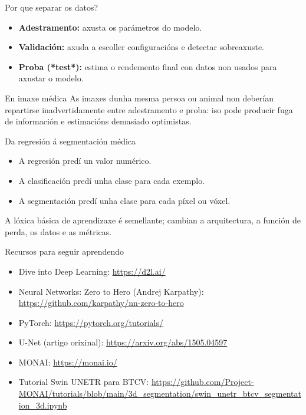 \documentclass[aspectratio=169,10pt]{beamer}
\begin{document}
\begin{frame}{Por que separar os datos?}
  \begin{itemize}
    \item \textbf{Adestramento:} axusta os parámetros do modelo.
    \item \textbf{Validación:} axuda a escoller configuracións e detectar sobreaxuste.
    \item \textbf{Proba (*test*):} estima o rendemento final con datos non usados para axustar o modelo.
  \end{itemize}
  \begin{alertblock}{En imaxe médica}
    As imaxes dunha mesma persoa ou animal non deberían repartirse inadvertidamente entre adestramento e proba: iso pode producir fuga de información e estimacións demasiado optimistas.
  \end{alertblock}
\end{frame}

\begin{frame}{Da regresión á segmentación médica}
  \begin{itemize}
    \item A regresión predí un valor numérico.
    \item A clasificación predí unha clase para cada exemplo.
    \item A segmentación predí unha clase para cada píxel ou vóxel.
  \end{itemize}
  \begin{center}
  \end{center}
  A lóxica básica de aprendizaxe é semellante; cambian a arquitectura, a función de perda, os datos e as métricas.
\end{frame}

\begin{frame}{Recursos para seguir aprendendo}
  \small
  \begin{itemize}
    \item Dive into Deep Learning: \url{https://d2l.ai/}
    \item Neural Networks: Zero to Hero (Andrej Karpathy): \url{https://github.com/karpathy/nn-zero-to-hero}
    \item PyTorch: \url{https://pytorch.org/tutorials/}
    \item U-Net (artigo orixinal): \url{https://arxiv.org/abs/1505.04597}
    \item MONAI: \url{https://monai.io/}
    \item Tutorial Swin UNETR para BTCV: \url{https://github.com/Project-MONAI/tutorials/blob/main/3d_segmentation/swin_unetr_btcv_segmentation_3d.ipynb}
  \end{itemize}
\end{frame}
\end{document}
